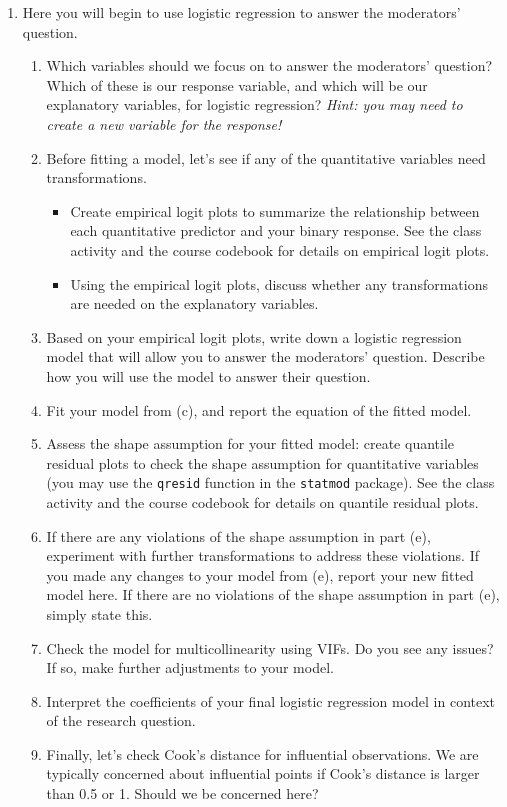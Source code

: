 \documentclass[11pt]{article}
\begin{document}
\begin{enumerate}
\item[3.] Here you will begin to use logistic regression to answer the moderators' question.

\begin{enumerate}
\item Which variables should we focus on to answer the moderators' question? Which of these is our response variable, and which will be our explanatory variables, for logistic regression? \textit{Hint: you may need to create a new variable for the response!}

\item Before fitting a model, let's see if any of the quantitative variables need transformations.
\begin{itemize}
\item Create empirical logit plots to summarize the relationship between each quantitative predictor and your binary response. See the class activity and the course codebook for details on empirical logit plots.
\item Using the empirical logit plots, discuss whether any transformations are needed on the explanatory variables.
\end{itemize}
\item Based on your empirical logit plots, write down a logistic regression model that will allow you to answer the moderators' question. Describe how you will use the model to answer their question.
\item Fit your model from (c), and report the equation of the fitted model.

\item Assess the shape assumption for your fitted model: create quantile residual plots to check the shape assumption for quantitative variables (you may use the \texttt{qresid} function in the \texttt{statmod} package). See the class activity and the course codebook for details on quantile residual plots.

\item If there are any violations of the shape assumption in part (e), experiment with further transformations to address these violations. If you made any changes to your model from (e), report your new fitted model here. If there are no violations of the shape assumption in part (e), simply state this.

\item Check the model for multicollinearity using VIFs. Do you see any issues? If so, make further adjustments to your model.

\item Interpret the coefficients of your final logistic regression model in context of the research question.

\item Finally, let’s check Cook’s distance for influential observations. We are typically concerned about influential points if Cook’s distance is larger than 0.5 or 1. Should we be concerned here?

\end{enumerate} 
\end{enumerate}
\end{document}
